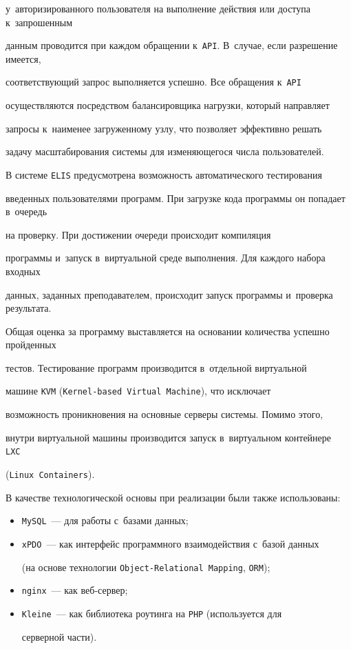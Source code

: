 у~авторизированного пользователя на выполнение действия или доступа к~запрошенным 


данным проводится при каждом обращении к~\verb"API". В~случае, если разрешение имеется, 


соответствующий запрос выполняется успешно. Все обращения к~\verb"API" 


осуществляются посредством балансировщика нагрузки, который направляет 


запросы к~наименее загруженному узлу, что позволяет эффективно решать 


задачу масштабирования  системы для изменяющегося числа пользователей.





В системе \verb"ELIS" предусмотрена возможность автоматического тестирования 


введенных пользователями программ. При загрузке кода программы он попадает в~очередь 


на проверку. При достижении очереди происходит компиляция 


программы и~запуск в~виртуальной среде выполнения. Для каждого набора входных


 данных, заданных преподавателем, происходит запуск программы и~проверка результата. 


 Общая оценка за программу выставляется на основании количества успешно пройденных 


 тестов. Тестирование программ производится в~отдельной виртуальной 


 машине \verb"KVM" (\verb"Kernel-based Virtual Machine"), что исключает 


 возможность проникновения на основные серверы системы. Помимо этого, 


 внут\-ри виртуальной машины производится запуск в~виртуальном контейнере \verb" LXC" 


 (\verb"Linux Containers").





В качестве технологической основы при реализации были также использо\-ваны:


\begin{itemize}


\item \verb"MySQL"~--- для работы с~базами данных;


\item \verb"xPDO"~--- как интерфейс программного взаимодействия с~базой данных 


(на основе технологии \verb"Object-Relational Mapping", \verb"ORM");


\item \verb"nginx"~--- как веб-сервер;


\item \verb"Kleine"~--- как библиотека роутинга на \verb"PHP" (используется для 


серверной части).


\end{itemize}





